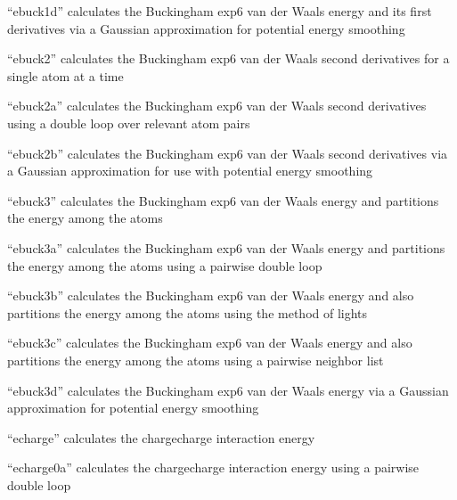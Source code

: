 \documentclass[letterpaper,11pt,english]{sphinxmanual}
\begin{document}
“ebuck1d” calculates the Buckingham exp\sphinxhyphen{}6 van der Waals energy
and its first derivatives via a Gaussian approximation for
potential energy smoothing


“ebuck2” calculates the Buckingham exp\sphinxhyphen{}6 van der Waals
second derivatives for a single atom at a time


“ebuck2a” calculates the Buckingham exp\sphinxhyphen{}6 van der Waals second
derivatives using a double loop over relevant atom pairs


“ebuck2b” calculates the Buckingham exp\sphinxhyphen{}6 van der Waals second
derivatives via a Gaussian approximation for use with potential
energy smoothing


“ebuck3” calculates the Buckingham exp\sphinxhyphen{}6 van der Waals energy
and partitions the energy among the atoms


“ebuck3a” calculates the Buckingham exp\sphinxhyphen{}6 van der Waals
energy and partitions the energy among the atoms using
a pairwise double loop


“ebuck3b” calculates the Buckingham exp\sphinxhyphen{}6 van der Waals
energy and also partitions the energy among the atoms using
the method of lights


“ebuck3c” calculates the Buckingham exp\sphinxhyphen{}6 van der Waals energy
and also partitions the energy among the atoms using a pairwise
neighbor list


“ebuck3d” calculates the Buckingham exp\sphinxhyphen{}6 van der Waals energy
via a Gaussian approximation for potential energy smoothing


“echarge” calculates the charge\sphinxhyphen{}charge interaction energy


“echarge0a” calculates the charge\sphinxhyphen{}charge interaction energy
using a pairwise double loop
\end{document}
